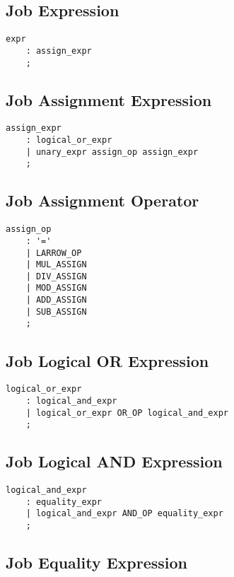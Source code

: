 \documentclass[prodmode,acmtecs]{acmsmall}
\begin{document}
\subsection{Job Expression}

\begin{lstlisting}
expr
	: assign_expr
	;
\end{lstlisting}


\subsection{Job Assignment Expression}

\begin{lstlisting}
assign_expr
	: logical_or_expr
	| unary_expr assign_op assign_expr
	;
\end{lstlisting}

\subsection{Job Assignment Operator}

\begin{lstlisting}
assign_op
	: '='
	| LARROW_OP
	| MUL_ASSIGN
	| DIV_ASSIGN
	| MOD_ASSIGN
	| ADD_ASSIGN
	| SUB_ASSIGN
	;
\end{lstlisting}



\subsection{Job Logical OR Expression}

\begin{lstlisting}
logical_or_expr
	: logical_and_expr
	| logical_or_expr OR_OP logical_and_expr
	;
\end{lstlisting}

\subsection{Job Logical AND Expression}

\begin{lstlisting}
logical_and_expr
	: equality_expr
	| logical_and_expr AND_OP equality_expr
	;
\end{lstlisting}

\subsection{Job Equality Expression}
\end{document}
